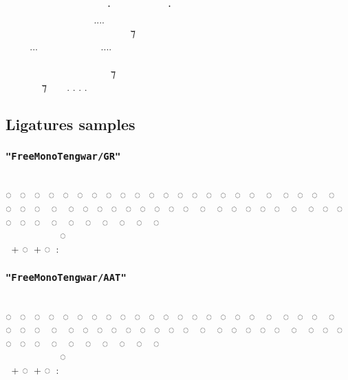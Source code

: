 \documentclass{article}
\begin{document}
\freeICU
  ‍   ⸱‍  ‍ ⸱ \\
    ‍....  ‍  \\
  ‍   ‍ ‍ ⁊ ‍  \\
...  ....   \\
         ‍ \\
 ‍ ‍‍   ⁊  ‍ ‍ \\
 ‍ ⁊  . . . . \normalfont


\newpage

\subsection{Ligatures samples}

\subsubsection*{\texttt{"FreeMonoTengwar/GR"}}

\freeGR
                          \\
◌ ◌ ◌ ◌ ◌ ◌ ◌ ◌ ◌ ◌ ◌ ◌ ◌ ◌ ◌ ◌ ◌ ◌ ◌ ◌ ◌ ◌ ◌ ◌ ◌ ◌ ◌ ◌ ◌ ◌ ◌ ◌ ◌ ◌ ◌ ◌ ◌ ◌ ◌ ◌ ◌ ◌ ◌ ◌ ◌ ◌ ◌ ◌ ◌ ◌ ◌ ◌ ◌ ◌ ◌ ◌\\
      ◌‍ ‍ ‍ ‍ \\
 \normalfont + \freeGR ◌ \normalfont + \freeGR ◌ : 

\subsubsection*{\texttt{"FreeMonoTengwar/AAT"}}

\freeAAT
                          \\
◌ ◌ ◌ ◌ ◌ ◌ ◌ ◌ ◌ ◌ ◌ ◌ ◌ ◌ ◌ ◌ ◌ ◌ ◌ ◌ ◌ ◌ ◌ ◌ ◌ ◌ ◌ ◌ ◌ ◌ ◌ ◌ ◌ ◌ ◌ ◌ ◌ ◌ ◌ ◌ ◌ ◌ ◌ ◌ ◌ ◌ ◌ ◌ ◌ ◌ ◌ ◌ ◌ ◌ ◌ ◌\\
      ◌‍ ‍ ‍ ‍ \\
 \normalfont + \freeAAT ◌ \normalfont + \freeAAT ◌ : 
\end{document}
